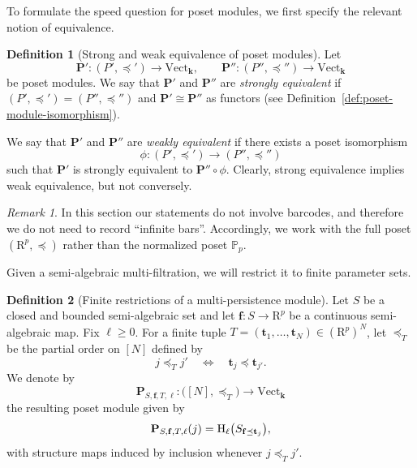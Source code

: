 \documentclass{amsart}[10pts]
\theoremstyle{definition}
\newtheorem{definition}{Definition}[section]
\theoremstyle{remark}
\newtheorem{remark}{Remark}
\theoremstyle{observation}
\numberwithin{equation}{section}
\newcommand {\R} {\mathrm{R}}
\newcommand {\kk}         {\mathbf{k}}
\newcommand {\PP}     {\mathbb{P}} %
\newcommand{\HH}  {\mbox{\rm H}}
\newcommand{\Vect}{\mathrm{Vect}}
\begin{document}
\medskip
To formulate the speed question for poset modules, we first specify the relevant notion of equivalence.

\begin{definition}[Strong and weak equivalence of poset modules]
\label{def:poset:equivalence}
Let
\[
\mathbf P':(P',\preceq')\to \Vect_{\kk},
\qquad
\mathbf P'':(P'',\preceq'')\to \Vect_{\kk}
\]
be poset modules.
We say that $\mathbf P'$ and $\mathbf P''$ are \emph{strongly equivalent} if $(P',\preceq')=(P'',\preceq'')$ and $\mathbf P'\cong \mathbf P''$ as functors (see Definition~\ref{def:poset-module-isomorphism}).

We say that $\mathbf P'$ and $\mathbf P''$ are \emph{weakly equivalent} if there exists a poset isomorphism
\[
\phi:(P',\preceq')\to (P'',\preceq'')
\]
such that $\mathbf P'$ is strongly equivalent to $\mathbf P''\circ \phi$.
Clearly, strong equivalence implies weak equivalence, but not conversely.
\end{definition}

\begin{remark}
In this section our statements do not involve barcodes, and therefore we do not need to record ``infinite bars''. Accordingly, we work with the full poset $(\R^p,\preceq)$ rather than the normalized poset $\PP_p$.
\end{remark}

\medskip
Given a semi-algebraic multi-filtration, we will restrict it to finite parameter sets.

\begin{definition}[Finite restrictions of a multi-persistence module]
\label{def:poset-module-finite}
Let $S$ be a closed and bounded semi-algebraic set and let $\mathbf f:S\to \R^p$ be a continuous semi-algebraic map. Fix $\ell\ge 0$.
For a finite tuple $T=(\mathbf t_1,\ldots,\mathbf t_N)\in (\R^p)^N$, let $\preceq_T$ be the partial order on $[N]$ defined by
\[
j\preceq_T j' \quad\Longleftrightarrow\quad \mathbf t_j\preceq \mathbf t_{j'}.
\]
We denote by
\[
\mathbf P_{S,\mathbf f,T,\ell}:\bigl([N],\preceq_T\bigr)\to \Vect_{\kk}
\]
the resulting poset module given by
\[
\mathbf P_{S,\mathbf f,T,\ell}(j)=\HH_\ell\bigl(S_{\mathbf f\preceq \mathbf t_j}\bigr),
\]
with structure maps induced by inclusion whenever $j\preceq_T j'$.
\end{definition}
\end{document}
